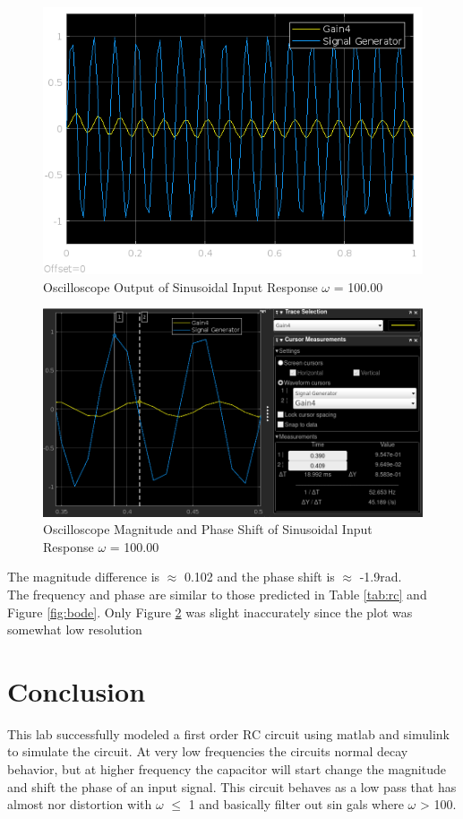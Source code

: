\documentclass[12pt]{article}
\begin{document}
			\begin{figure}[H]
				\centering
				\includegraphics[width=1\linewidth]{"Code/Fig/sine_input_output_w_100.png"} 
				\caption{Oscilloscope Output of Sinusoidal Input Response $\omega$ = 100.00}
				\label{fig:slx_sine_input_output_w_100}
			\end{figure}
			\begin{figure}[H]
				\centering
				\includegraphics[width=1\linewidth]{"Code/Fig/w_100.png"} 
				\caption{Oscilloscope Magnitude and Phase Shift  of Sinusoidal Input Response $\omega$ = 100.00}
				\label{fig:slx_sine_input_output_w_100_diff}
			\end{figure}
			The magnitude difference is $\approx$ 0.102 and the phase shift is $\approx$ -1.9rad. \\
			The frequency and phase are similar to those predicted in Table \ref{tab:rc} and Figure \ref{fig:bode}. Only Figure \ref{fig:slx_sine_input_output_w_100_diff} was slight inaccurately since the plot was somewhat low resolution 
		
	\section{Conclusion}
	This lab successfully modeled a first order RC circuit using matlab and simulink to simulate the circuit.  At very low frequencies the circuits normal decay behavior, but at higher frequency the capacitor will start change the magnitude and shift the phase of an input signal. This circuit behaves as a low pass that has almost nor distortion with $\omega$ $\leq$ 1 and basically filter out sin gals where $\omega$ > 100.
\end{document}
